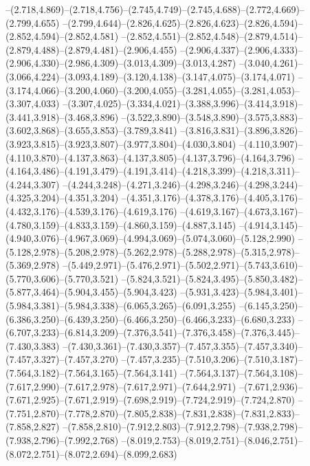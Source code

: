   --(2.718,4.869)--(2.718,4.756)--(2.745,4.749)--(2.745,4.688)--(2.772,4.669)--(2.799,4.655)%
  --(2.799,4.644)--(2.826,4.625)--(2.826,4.623)--(2.826,4.594)--(2.852,4.594)--(2.852,4.581)%
  --(2.852,4.551)--(2.852,4.548)--(2.879,4.514)--(2.879,4.488)--(2.879,4.481)--(2.906,4.455)%
  --(2.906,4.337)--(2.906,4.333)--(2.906,4.330)--(2.986,4.309)--(3.013,4.309)--(3.013,4.287)%
  --(3.040,4.261)--(3.066,4.224)--(3.093,4.189)--(3.120,4.138)--(3.147,4.075)--(3.174,4.071)%
  --(3.174,4.066)--(3.200,4.060)--(3.200,4.055)--(3.281,4.055)--(3.281,4.053)--(3.307,4.033)%
  --(3.307,4.025)--(3.334,4.021)--(3.388,3.996)--(3.414,3.918)--(3.441,3.918)--(3.468,3.896)%
  --(3.522,3.890)--(3.548,3.890)--(3.575,3.883)--(3.602,3.868)--(3.655,3.853)--(3.789,3.841)%
  --(3.816,3.831)--(3.896,3.826)--(3.923,3.815)--(3.923,3.807)--(3.977,3.804)--(4.030,3.804)%
  --(4.110,3.907)--(4.110,3.870)--(4.137,3.863)--(4.137,3.805)--(4.137,3.796)--(4.164,3.796)%
  --(4.164,3.486)--(4.191,3.479)--(4.191,3.414)--(4.218,3.399)--(4.218,3.311)--(4.244,3.307)%
  --(4.244,3.248)--(4.271,3.246)--(4.298,3.246)--(4.298,3.244)--(4.325,3.204)--(4.351,3.204)%
  --(4.351,3.176)--(4.378,3.176)--(4.405,3.176)--(4.432,3.176)--(4.539,3.176)--(4.619,3.176)%
  --(4.619,3.167)--(4.673,3.167)--(4.780,3.159)--(4.833,3.159)--(4.860,3.159)--(4.887,3.145)%
  --(4.914,3.145)--(4.940,3.076)--(4.967,3.069)--(4.994,3.069)--(5.074,3.060)--(5.128,2.990)%
  --(5.128,2.978)--(5.208,2.978)--(5.262,2.978)--(5.288,2.978)--(5.315,2.978)--(5.369,2.978)%
  --(5.449,2.971)--(5.476,2.971)--(5.502,2.971)--(5.743,3.610)--(5.770,3.606)--(5.770,3.521)%
  --(5.824,3.521)--(5.824,3.495)--(5.850,3.482)--(5.877,3.464)--(5.904,3.455)--(5.904,3.423)%
  --(5.931,3.423)--(5.984,3.401)--(5.984,3.381)--(5.984,3.338)--(6.065,3.265)--(6.091,3.255)%
  --(6.145,3.250)--(6.386,3.250)--(6.439,3.250)--(6.466,3.250)--(6.466,3.233)--(6.680,3.233)%
  --(6.707,3.233)--(6.814,3.209)--(7.376,3.541)--(7.376,3.458)--(7.376,3.445)--(7.430,3.383)%
  --(7.430,3.361)--(7.430,3.357)--(7.457,3.355)--(7.457,3.340)--(7.457,3.327)--(7.457,3.270)%
  --(7.457,3.235)--(7.510,3.206)--(7.510,3.187)--(7.564,3.182)--(7.564,3.165)--(7.564,3.141)%
  --(7.564,3.137)--(7.564,3.108)--(7.617,2.990)--(7.617,2.978)--(7.617,2.971)--(7.644,2.971)%
  --(7.671,2.936)--(7.671,2.925)--(7.671,2.919)--(7.698,2.919)--(7.724,2.919)--(7.724,2.870)%
  --(7.751,2.870)--(7.778,2.870)--(7.805,2.838)--(7.831,2.838)--(7.831,2.833)--(7.858,2.827)%
  --(7.858,2.810)--(7.912,2.803)--(7.912,2.798)--(7.938,2.798)--(7.938,2.796)--(7.992,2.768)%
  --(8.019,2.753)--(8.019,2.751)--(8.046,2.751)--(8.072,2.751)--(8.072,2.694)--(8.099,2.683)%
